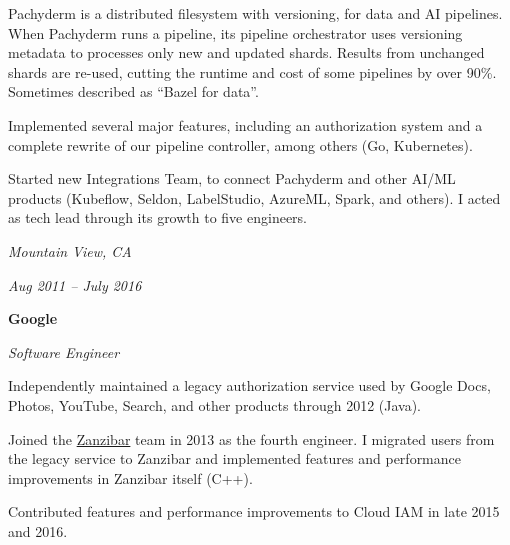 \documentclass[10pt, letterpaper]{article}
\begin{document}
\vspace{0.1 cm}

\begin{onecolentry}
    \begin{highlights}
        \item Pachyderm is a distributed filesystem with versioning, for data and AI pipelines. When Pachyderm runs a pipeline, its pipeline orchestrator uses versioning metadata to processes only new and updated shards. Results from unchanged shards are re-used, cutting the runtime and cost of some pipelines by over 90\%. Sometimes described as ``Bazel for data''.
        \item Implemented several major features, including an authorization system and a complete rewrite of our pipeline controller, among others (Go, Kubernetes).
        \item Started new Integrations Team, to connect Pachyderm and other AI/ML products (Kubeflow, Seldon, LabelStudio, AzureML, Spark, and others). I acted as tech lead through its growth to five engineers.
    \end{highlights}
  \end{onecolentry}

\vspace{0.2 cm}

\begin{twocolentry}{
    \textit{Mountain View, CA}

    \textit{Aug 2011 – July 2016}
}
    \textbf{Google}

    \textit{Software Engineer}
\end{twocolentry}

\vspace{0.1 cm}
\begin{onecolentry}
    \begin{highlights}
        \item Independently maintained a legacy authorization service used by Google Docs, Photos, YouTube, Search, and other products through 2012 (Java).
        \item Joined the \href{https://research.google/pubs/zanzibar-googles-consistent-global-authorization-system/}{Zanzibar} team in 2013 as the fourth engineer. I migrated users from the legacy service to Zanzibar and implemented features and performance improvements in Zanzibar itself (C++).
        \item Contributed features and performance improvements to Cloud IAM in late 2015 and 2016.
    \end{highlights}
\end{onecolentry}
\end{document}
